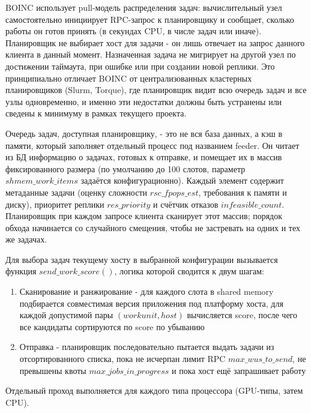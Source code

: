 \documentclass[a4paper,12pt]{extarticle}
\begin{document}
BOINC использует pull-модель распределения задач: вычислительный узел самостоятельно инициирует RPC-запрос к планировщику и сообщает, сколько работы он готов принять (в секундах CPU, в числе задач или иначе). Планировщик не выбирает хост для задачи - он лишь отвечает на запрос данного клиента в данный момент. Назначенная задача не мигрирует на другой узел по достижении таймаута, при ошибке или при создании новой реплики. Это принципиально отличает BOINC от централизованных кластерных планировщиков (Slurm, Torque), где планировщик видит всю очередь задач и все узлы одновременно, и именно эти недостатки должны быть устранены или сведены к минимуму в рамках текущего проекта.

Очередь задач, доступная планировщику, - это не вся база данных, а кэш в памяти, который заполняет отдельный процесс под названием feeder. Он читает из БД информацию о задачах, готовых к отправке, и помещает их в массив фиксированного размера (по умолчанию до 100 слотов, параметр $shmem\_work\_items$ задаётся конфигурационно). Каждый элемент содержит метаданные задачи (оценку сложности $rsc\_fpops\_est$, требования к памяти и диску), приоритет реплики $res\_priority$ и счётчик отказов $infeasible\_count$. Планировщик при каждом запросе клиента сканирует этот массив; порядок обхода начинается со случайного смещения, чтобы не застревать на одних и тех же задачах.

Для выбора задач текущему хосту в выбранной конфигурации вызывается функция $send\_work\_score()$, логика которой сводится к двум шагам:
\begin{enumerate}
    \item Сканирование и ранжирование - для каждого слота в shared memory подбирается совместимая версия приложения под платформу хоста, для каждой допустимой пары $(workunit, host)$ вычисляется score, после чего все кандидаты сортируются по score по убыванию
    \item Отправка - планировщик последовательно пытается выдать задачи из отсортированного списка, пока не исчерпан лимит RPC $max\_wus\_to\_send$, не превышены квоты $max\_jobs\_in\_progress$ и пока хост ещё запрашивает работу
\end{enumerate}
Отдельный проход выполняется для каждого типа процессора (GPU-типы, затем CPU).
\end{document}
